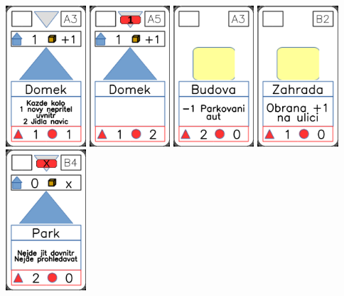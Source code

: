 \documentclass[a4paper]{article}
\begin{document}
	\includegraphics[width=3.0cm]{img-3_2}
	\includegraphics[width=3.0cm]{img-3_4}
	\includegraphics[width=3.0cm]{img-2_2}
	\includegraphics[width=3.0cm]{img-2_21}
	\includegraphics[width=3.0cm]{img-3_23}
\end{document}
